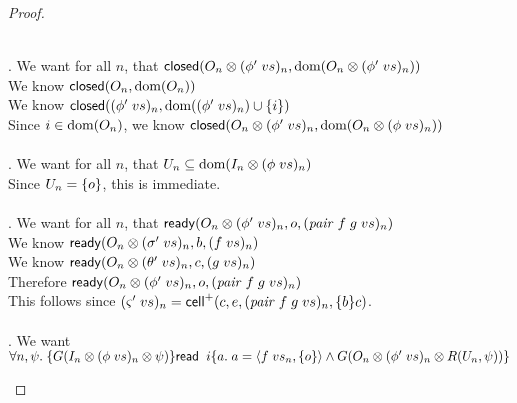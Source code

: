 \begin{proof}
\begin{enumerate}
\begin{tabbedproof}
  \\ . We want for all $n$, that $\mathsf{closed}({O_n \otimes (\phi'\;vs)_n}, {\mbox{dom}({O_n \otimes (\phi'\;vs)_n})})$\\
  \ooo We know $\mathsf{closed}({O_n}, {\mbox{dom}({O_n})})$ \\
  \ooo We know $\mathsf{closed}({(\phi'\;vs)_n}, {\mbox{dom}({(\phi'\;vs)_n}) \cup \{{i}\}})$ \\
  \ooo Since $i \in \mbox{dom}({O_n})$, we know $\mathsf{closed}({O_n \otimes (\phi'\;vs)_n}, {\mbox{dom}({O_n \otimes (\phi\;vs)_n})})$ \\

  \\ . We want for all $n$, that $U_n \subseteq \mbox{dom}({I_n \otimes (\phi\;vs)_n})$ \\
  \ooo Since $U_n = \{{o}\}$, this is immediate. \\

  \\ . We want for all $n$, that $\mathsf{ready}({O_n \otimes (\phi'\;vs)_n}, {o}, {(\mathit{pair}\;f\;g\;vs)_n})$ \\
  \ooo We know $\mathsf{ready}({O_n \otimes (\sigma'\;vs)_n}, {b}, {(f\;vs)_n})$ \\
  \ooo We know $\mathsf{ready}({O_n \otimes (\theta'\;vs)_n}, {c}, {(g\;vs)_n})$\\
  \ooo Therefore $\mathsf{ready}({O_n \otimes (\phi'\;vs)_n}, {o}, {(\mathit{pair}\;f\;g\;vs)_n})$ \\
  \ooo This follows since $(\varsigma'\;vs)_n = \mathsf{cell}^{+}({c}, {e}, {(\mathit{pair}\;f\;g\;vs)_n}, {\{{b}\}{c}})$.  \\
  

  \\ . We want $\forall n, \psi.\; \{{G(I_n \otimes (\phi\;vs)_n \otimes \psi)}\}{\mathsf{read}\;\;i}\{{a}.\;{a = \left<{f\;vs_n},{\{{o}\}}\right> \land G(O_n \otimes (\phi'\;vs)_n \otimes R(U_n, \psi))}\}$ \\


\end{tabbedproof}
\end{enumerate}
\end{proof}
